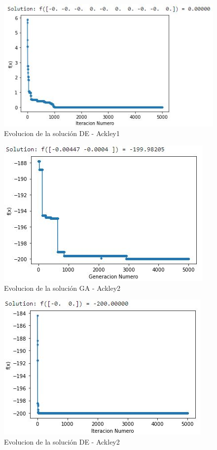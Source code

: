 \documentclass[10pt]{article}
\begin{document}
\begin{figure}[H]
\centerline{\includegraphics{ack-1-de.jpg}}
\caption{Evolucion de la solución DE - Ackley1}
\label{fig_2}
\end{figure}

\begin{figure}[H]
\centerline{\includegraphics{ack-2-ga.jpg}}
\caption{Evolucion de la solución GA - Ackley2}
\label{fig_3}
\end{figure}

\begin{figure}[H]
\centerline{\includegraphics{ack-2-de.jpg}}
\caption{Evolucion de la solución DE - Ackley2}
\label{fig_4}
\end{figure}
\end{document}
